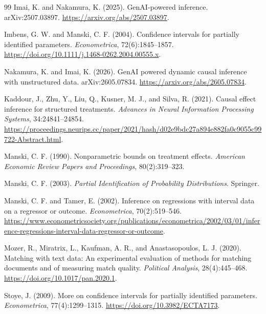 \documentclass[11pt]{article}
\theoremstyle{definition}
\theoremstyle{plain}
\theoremstyle{remark}
\begin{document}
\begin{thebibliography}{99}
Imai, K. and Nakamura, K. (2025).
\newblock GenAI-powered inference.
\newblock arXiv:2507.03897.
\newblock \url{https://arxiv.org/abs/2507.03897}.

Imbens, G. W. and Manski, C. F. (2004).
\newblock Confidence intervals for partially identified parameters.
\newblock \emph{Econometrica}, 72(6):1845--1857.
\newblock \url{https://doi.org/10.1111/j.1468-0262.2004.00555.x}.

Nakamura, K. and Imai, K. (2026).
\newblock GenAI powered dynamic causal inference with unstructured data.
\newblock arXiv:2605.07834.
\newblock \url{https://arxiv.org/abs/2605.07834}.

Kaddour, J., Zhu, Y., Liu, Q., Kusner, M. J., and Silva, R. (2021).
\newblock Causal effect inference for structured treatments.
\newblock \emph{Advances in Neural Information Processing Systems}, 34:24841--24854.
\newblock \url{https://proceedings.neurips.cc/paper/2021/hash/d02e9bdc27a894e882fa0c9055c99722-Abstract.html}.

Manski, C. F. (1990).
\newblock Nonparametric bounds on treatment effects.
\newblock \emph{American Economic Review Papers and Proceedings}, 80(2):319--323.

Manski, C. F. (2003).
\newblock \emph{Partial Identification of Probability Distributions}.
\newblock Springer.

Manski, C. F. and Tamer, E. (2002).
\newblock Inference on regressions with interval data on a regressor or outcome.
\newblock \emph{Econometrica}, 70(2):519--546.
\newblock \url{https://www.econometricsociety.org/publications/econometrica/2002/03/01/inference-regressions-interval-data-regressor-or-outcome}.

Mozer, R., Miratrix, L., Kaufman, A. R., and Anastasopoulos, L. J. (2020).
\newblock Matching with text data: An experimental evaluation of methods for matching documents and of measuring match quality.
\newblock \emph{Political Analysis}, 28(4):445--468.
\newblock \url{https://doi.org/10.1017/pan.2020.1}.

Stoye, J. (2009).
\newblock More on confidence intervals for partially identified parameters.
\newblock \emph{Econometrica}, 77(4):1299--1315.
\newblock \url{https://doi.org/10.3982/ECTA7173}.


\end{thebibliography}
\end{document}
